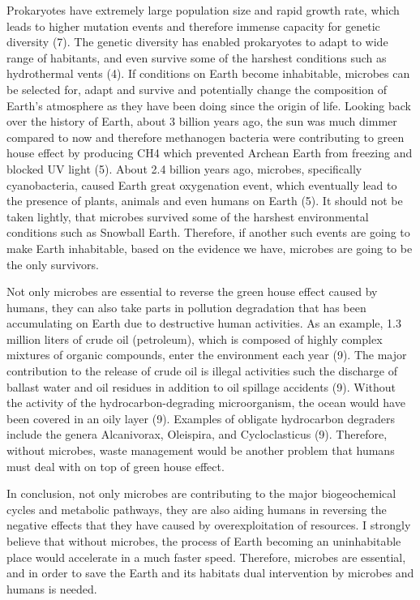 \documentclass[]{article}
\begin{document}
Prokaryotes have extremely large population size and rapid growth rate,
which leads to higher mutation events and therefore immense capacity for
genetic diversity (7). The genetic diversity has enabled prokaryotes to
adapt to wide range of habitants, and even survive some of the harshest
conditions such as hydrothermal vents (4). If conditions on Earth become
inhabitable, microbes can be selected for, adapt and survive and
potentially change the composition of Earth's atmosphere as they have
been doing since the origin of life. Looking back over the history of
Earth, about 3 billion years ago, the sun was much dimmer compared to
now and therefore methanogen bacteria were contributing to green house
effect by producing CH4 which prevented Archean Earth from freezing and
blocked UV light (5). About 2.4 billion years ago, microbes,
specifically cyanobacteria, caused Earth great oxygenation event, which
eventually lead to the presence of plants, animals and even humans on
Earth (5). It should not be taken lightly, that microbes survived some
of the harshest environmental conditions such as Snowball Earth.
Therefore, if another such events are going to make Earth inhabitable,
based on the evidence we have, microbes are going to be the only
survivors.

Not only microbes are essential to reverse the green house effect caused
by humans, they can also take parts in pollution degradation that has
been accumulating on Earth due to destructive human activities. As an
example, 1.3 million liters of crude oil (petroleum), which is composed
of highly complex mixtures of organic compounds, enter the environment
each year (9). The major contribution to the release of crude oil is
illegal activities such the discharge of ballast water and oil residues
in addition to oil spillage accidents (9). Without the activity of the
hydrocarbon-degrading microorganism, the ocean would have been covered
in an oily layer (9). Examples of obligate hydrocarbon degraders include
the genera Alcanivorax, Oleispira, and Cycloclasticus (9). Therefore,
without microbes, waste management would be another problem that humans
must deal with on top of green house effect.

In conclusion, not only microbes are contributing to the major
biogeochemical cycles and metabolic pathways, they are also aiding
humans in reversing the negative effects that they have caused by
overexploitation of resources. I strongly believe that without microbes,
the process of Earth becoming an uninhabitable place would accelerate in
a much faster speed. Therefore, microbes are essential, and in order to
save the Earth and its habitats dual intervention by microbes and humans
is needed.
\end{document}
